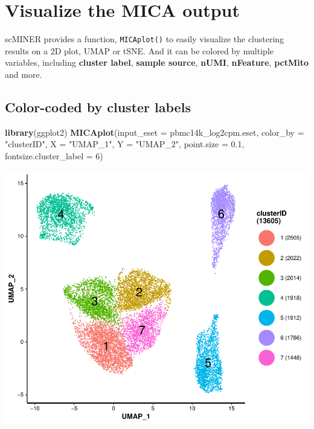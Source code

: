 \documentclass[
  12pt,
]{book}
\newenvironment{Shaded}{\begin{snugshade}}{\end{snugshade}}
\newcommand{\AttributeTok}[1]{\textcolor[rgb]{0.13,0.29,0.53}{#1}}
\newcommand{\DecValTok}[1]{\textcolor[rgb]{0.00,0.00,0.81}{#1}}
\newcommand{\FloatTok}[1]{\textcolor[rgb]{0.00,0.00,0.81}{#1}}
\newcommand{\FunctionTok}[1]{\textcolor[rgb]{0.13,0.29,0.53}{\textbf{#1}}}
\newcommand{\NormalTok}[1]{#1}
\newcommand{\StringTok}[1]{\textcolor[rgb]{0.31,0.60,0.02}{#1}}
\begin{document}
\section{Visualize the MICA output}\label{visualize-the-mica-output}

scMINER provides a function, \texttt{MICAplot()} to easily visualize the clustering results on a 2D plot, UMAP or tSNE. And it can be colored by multiple variables, including \textbf{cluster label}, \textbf{sample source}, \textbf{nUMI}, \textbf{nFeature}, \textbf{pctMito} and more.

\subsection{Color-coded by cluster labels}\label{color-coded-by-cluster-labels}

\begin{Shaded}
\begin{Highlighting}[]
\FunctionTok{library}\NormalTok{(ggplot2)}
\FunctionTok{MICAplot}\NormalTok{(}\AttributeTok{input\_eset =}\NormalTok{ pbmc14k\_log2cpm.eset, }\AttributeTok{color\_by =} \StringTok{"clusterID"}\NormalTok{, }\AttributeTok{X =} \StringTok{"UMAP\_1"}\NormalTok{, }\AttributeTok{Y =} \StringTok{"UMAP\_2"}\NormalTok{, }\AttributeTok{point.size =} \FloatTok{0.1}\NormalTok{, }\AttributeTok{fontsize.cluster\_label =} \DecValTok{6}\NormalTok{)}
\end{Highlighting}
\end{Shaded}

\begin{center}\includegraphics{_main_files/figure-latex/visualize-mica-output-cluster-1} \end{center}
\end{document}
